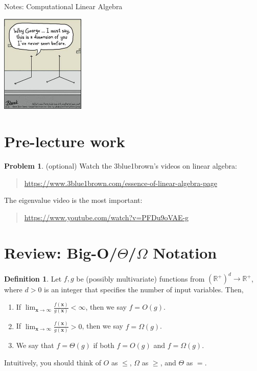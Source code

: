 \documentclass[10pt]{article}
\theoremstyle{definition}
\newtheorem{problem}{Problem}
\newtheorem{defn}{Definition}
\newcommand{\R}{\mathbb R}
\newcommand{\x}{\mathbf x}
\begin{document}
\begin{center}
\Huge
Notes: Computational Linear Algebra
\end{center}

\begin{center}
\includegraphics[width=0.3\textwidth]{comic}
\end{center}


\section{Pre-lecture work}

\begin{problem}
    (optional) Watch the 3blue1brown's videos on linear algebra:
    \begin{quote}
        \url{https://www.3blue1brown.com/essence-of-linear-algebra-page}
    \end{quote}
    The eigenvalue video is the most important:
    \begin{quote}
        \url{https://www.youtube.com/watch?v=PFDu9oVAE-g}
    \end{quote}
\end{problem}


\section{Review: Big-O/$\Theta$/$\Omega$ Notation}

\begin{defn}
    Let $f,g$ be (possibly multivariate) functions from $(\R^+)^d\to\R^+$,
    where $d>0$ is an integer that specifies the number of input variables.
    Then,
    \begin{enumerate}
        \item If $\displaystyle\lim_{\x\to\infty} \frac{f(\x)}{g(\x)} < \infty$, then we say $f = O(g)$.
        \item If $\displaystyle\lim_{\x\to\infty} \frac{f(\x)}{g(\x)} > 0$, then we say $f = \Omega(g)$.
        \item We say that $f = \Theta(g)$ if both $f=O(g)$ and $f=\Omega(g)$.
    \end{enumerate}
    Intuitively, you should think of $O$ as $\le$, $\Omega$ as $\ge$, and $\Theta$ as $=$.
\end{defn}
\end{document}
